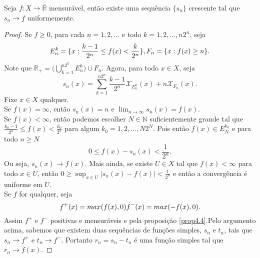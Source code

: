 \begin{teorema}
    Seja $f: X \to \overline{\mathbb{R}}$ mensurável, então existe uma sequência $\{s_n\}$ crescente tal que $s_n \to f$ uniformemente. 
    \begin{proof}
        Se $f \geq 0$, para cada $n=1,2,...$ e todo $k=1,2, ... , n 2^n$, seja
        \[
            E_{n} ^k = \{ x : \frac{k-1}{2^n} \leq f(x) < \frac{k}{2^n} \}, \\
            F_n = \{ x: f(x) \geq n \}.
        \]
        Note que $\mathbb{R}_+ = \bigg(\bigcup _{k=1} ^{n2^n} E_n ^k \bigg) \cup F_n $. Agora, para todo $x \in X$, seja
        \[
        s_n (x) = \sum _{k=1} ^{n 2^n} \frac{k-1}{2^n} \mathcal{X}_{E_n ^k} (x) + n \mathcal{X}_{F_n} (x).     
        \]
        Fixe $x \in X$ qualquer. \\
        Se $f(x) = \infty$, então $s_n(x) = n$ e $\lim _{n \to \infty} s_n (x)= f(x)$. \\
        Se $f(x) < \infty$, então podemos escolher $N \in \mathbb{N}$ suficientemente grande tal que $ \frac{k_0-1}{2^n} \leq f(x) < \frac{k_0}{2^n}$ para algum $k_0 = 1, 2, ... , N2^N$. Pois então $f(x) \in E_{N} ^{k_0}$ e para todo $n \geq N$
        \[
        0 \leq f(x) - s_n(x) < \frac{1}{2^n}.  
        \]
        Ou seja, $s_n(x) \to f(x)$. Mais ainda, se existe $U \in X$ tal que $f(x) < \infty$ para todo $x \in U$, então $0 \geq \sup_{x \in U} |s_n(x) - f(x)| < \frac{1}{2^n}$ e então a convergência é uniforme em $U$. \\
        Se $f$ for qualquer, seja 
        \[
        f^+ (x) = max(f(x),0) \\ f^- (x) = max(-f(x),0).    
        \] 
        Assim $f^+$ e $f^-$ positivas e mensuráveis e pela proposição \ref{prop4.4}.Pelo argumento acima, sabemos que existem duas sequências de funções simples, $s_n$ e $t_n$, tais que $s_n \to f^+$ e $t_n \to f^-$. Portanto $r_n = s_n - t_n$ é uma função simples tal que $r_n \to f(x)$.
    \end{proof}
\end{teorema}

